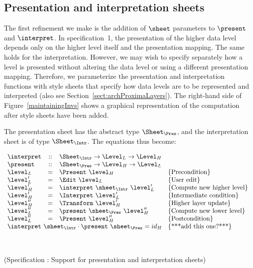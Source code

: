 %																
%																
%																
\subsection{Presentation and interpretation sheets} \label{sect:maintainingSheet}

The first refinement we make is the addition of $\sheet$ parameters to $\present$ and $\interpret$. In specification~1, the presentation of the higher data level depends only on the higher level itself and the presentation mapping. The same holds for the interpretation. However, we may wish to specify separately how a level is presented without altering the data level or using a different presentation mapping. Therefore, we parameterize the presentation and interpretation functions with style sheets that specify how data levels are to be represented and interpreted (also see Section~\ref{sect:archProximaLayers}). The right-hand side of Figure~\ref{maintainingInvs} shows a graphical representation of the computation after style sheets have been added. 

The presentation sheet has the abstract type $\Sheet_{\Pres}$, and the interpretation sheet is of type $\Sheet_{\Intr}$. The equations thus become:

\begin{small}
 \label{spec:sheets}
\( \begin{array}{lcll}
\interpret &::& \Sheet_{\Intr} \rightarrow  \Level_{L} \rightarrow \Level_{H} \\
\present &::& \Sheet_{\Pres} \rightarrow  \Level_{H} \rightarrow \Level_{L} \\
\level_{L} & = & \Present~\level_{H}					& \text{\{Precondition\}}\\
\level'_{L} & = & \Edit~\level_{L}						& \text{\{User edit\}}\\
\level'_{H} & = & \interpret~\sheet_{\Intr}~\level'_{L}	& \text{\{Compute new higher level\}}\\
\level'_{H} & = & \Interpret~\level'_{L}					& \text{\{Intermediate condition\}}\\
\level''_{H}& = & \Transform~\level'_{H} 					& \text{\{Higher layer update\}}\\
\level''_{L} & = & \present~\sheet_{\Pres}~\level''_{H}    & \text{\{Compute new lower level\}}\\
\level''_{L} & = & \Present~\level''_{H}					& \text{\{Postcondition\}}\\
\lefteqn{\interpret~\sheet_{\Intr} \cdot \present~\sheet_{\Pres} = id_{H}} & & & \text{\{***add this one?***\}}\\
\end{array}\)\end{small}\\
\begin{center}(Specification \thespecification: Support for presentation and interpretation sheets)\end{center}\vspace{1em}

